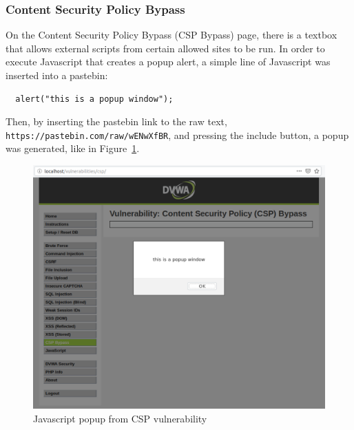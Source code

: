\documentclass[11pt]{article}
\begin{document}
\subsubsection*{Content Security Policy Bypass}
On the Content Security Policy Bypass (CSP Bypass) page, there is a textbox that allows external scripts from certain allowed sites
to be run. In order to execute Javascript that creates a popup alert, a simple line of Javascript was inserted into a pastebin:
\begin{verbatim}
  alert("this is a popup window");
\end{verbatim}
Then, by inserting the pastebin link to the raw text, \verb|https://pastebin.com/raw/wENwXfBR|, and pressing the include button, a popup
was generated, like in Figure~\ref{fig:CSP}.
\begin{figure}[!h]
  \centering
  \includegraphics[width=.71\linewidth]{./csp_popup.png}
  \caption{\label{fig:CSP}
  Javascript popup from CSP vulnerability}
\end{figure}
\end{document}
